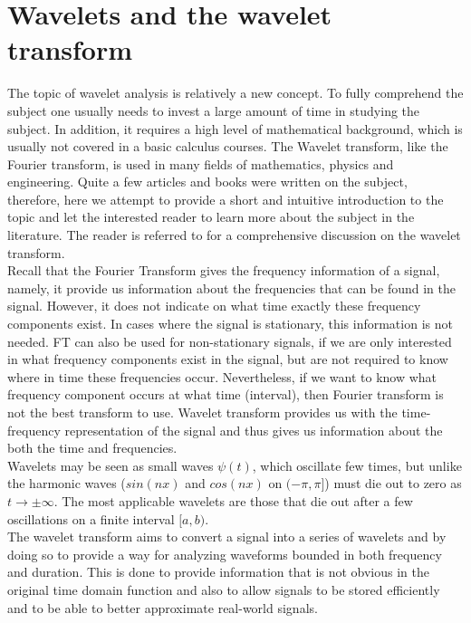 \documentclass[12pt,english]{report}
\begin{document}
\chapter{Wavelets and the wavelet transform}

The topic of wavelet analysis is relatively a new concept. To fully comprehend the subject one usually needs to invest a large amount of time in studying the subject. In addition, it requires a high level of mathematical background, which is usually not covered in a basic calculus courses.
The Wavelet transform, like the Fourier transform, is used in many fields of mathematics, physics and engineering. Quite a few articles and books were written on the subject, therefore, here we attempt to provide a short and intuitive introduction to the topic and let the interested reader to learn more about the subject in the literature. The reader is referred to \cite{meyer1992wavelets} for a comprehensive discussion on the wavelet transform.\\ 

Recall that the Fourier Transform gives the frequency information of a signal, namely, it provide us information about the frequencies that can be found in the signal. However, it does not indicate on what time exactly these frequency components exist. In cases where the signal is stationary, this information is not needed. FT can also be used for non-stationary signals, if we are only interested in what frequency components exist in the signal, but are not required to know where in time these frequencies occur. Nevertheless, if we want to know what frequency component occurs at what time (interval), then Fourier transform is not the best transform to use. Wavelet transform provides us with the time-frequency representation of the signal and thus gives us information about the both the time and frequencies.\\

Wavelets may be seen as small waves $\psi(t)$, which oscillate few times, but unlike the harmonic waves ($sin(nx)$ and $cos(nx)$ on $(-\pi,\pi]$) must die out to zero as $t \rightarrow \pm\infty$. The most applicable wavelets are those that die out after a few oscillations on a finite interval $[a,b)$. \\

The wavelet transform aims to convert a signal into a series of wavelets and by doing so to provide a way for analyzing waveforms bounded in both frequency and duration. This is done to provide information that is not obvious in the original time domain function and also to allow signals to be stored efficiently and to be able to better approximate real-world signals. \\
\end{document}
